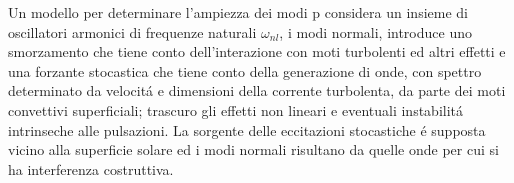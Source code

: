 \documentclass[../main.tex]{subfiles}
\begin{document}

\begin{errata}

Un modello per determinare l'ampiezza dei modi p considera un insieme di oscillatori armonici di frequenze naturali $\omega_{nl}$, i modi normali, introduce uno smorzamento che tiene conto dell'interazione con moti turbolenti ed altri effetti e una forzante stocastica che tiene conto della generazione di onde, con spettro determinato da velocit\'a e dimensioni della corrente turbolenta, da parte dei moti convettivi superficiali; trascuro gli effetti non lineari e eventuali instabilit\'a intrinseche alle pulsazioni. La sorgente delle eccitazioni stocastiche \'e supposta vicino alla superficie solare ed i modi normali risultano da quelle onde per cui si ha interferenza costruttiva.

\end{errata}



\end{document}
